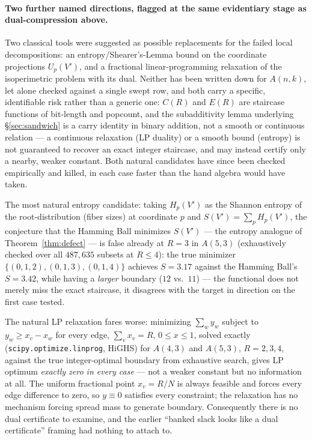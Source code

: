 \paragraph{Two further named directions, flagged at the same evidentiary
stage as dual-compression above.} Two classical tools were suggested
as possible replacements for the failed local decompositions: an
entropy/Shearer's-Lemma bound on the coordinate projections
$U_p(V')$, and a fractional linear-programming relaxation of the
isoperimetric problem with its dual. Neither has been written down for
$A(n,k)$, let alone checked against a single swept row, and both carry
a specific, identifiable risk rather than a generic one: $C(R)$ and
$E(R)$ are staircase functions of bit-length and popcount, and the
subadditivity lemma underlying \S\ref{sec:sandwich} is a carry identity
in binary addition, not a smooth or continuous relation --- a
continuous relaxation (LP duality) or a smooth bound (entropy) is not
guaranteed to recover an exact integer staircase, and may instead
certify only a nearby, weaker constant. Both natural candidates have
since been checked empirically and killed, in each case faster than the
hand algebra would have taken.

The most natural entropy candidate: taking $H_p(V')$ as the Shannon
entropy of the root-distribution (fiber sizes) at coordinate $p$ and
$S(V')=\sum_p H_p(V')$, the conjecture that the Hamming Ball minimizes
$S(V')$ --- the entropy analogue of Theorem~\ref{thm:defect} --- is
false already at $R=3$ in $A(5,3)$ (exhaustively checked over all
$487{,}635$ subsets at $R\le4$): the true minimizer
$\{(0,1,2),(0,1,3),(0,1,4)\}$ achieves $S=3.17$ against the Hamming
Ball's $S=3.42$, while having a \emph{larger} boundary ($12$ vs.\ $11$)
--- the functional does not merely miss the exact staircase, it
disagrees with the target in direction on the first case tested.

The natural LP relaxation fares worse: minimizing $\sum_w y_w$ subject
to $y_w \ge x_v - x_w$ for every edge, $\sum_v x_v = R$, $0\le x\le1$,
solved exactly (\texttt{scipy.optimize.linprog}, HiGHS) for $A(4,3)$
and $A(5,3)$, $R=2,3,4$, against the true integer-optimal boundary from
exhaustive search, gives LP optimum \emph{exactly zero in every case}
--- not a weaker constant but no information at all. The uniform
fractional point $x_v=R/N$ is always feasible and forces every edge
difference to zero, so $y\equiv0$ satisfies every constraint; the
relaxation has no mechanism forcing spread mass to generate boundary.
Consequently there is no dual certificate to examine, and the earlier
``banked slack looks like a dual certificate'' framing had nothing to
attach to.

